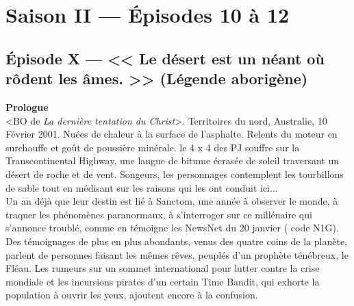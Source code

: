 \documentclass[11pt,twoside,a4paper]{book}
\begin{document}
\clearpage

\chapter*{Saison II --- {\'E}pisodes 10 {\`a} 12}

\section*{{\'E}pisode X --- << \textbf{Le d{\'e}sert est un n{\'e}ant o{\`u} r{\^o}dent les {\^a}mes. } >> (L{\'e}gende aborig{\`e}ne)}


\textbf{\large Prologue}~\\

<BO de \emph{La derni{\`e}re tentation du Christ}>. Territoires du nord, Australie, 10 F{\'e}vrier 2001. Nu{\'e}es de chaleur {\`a} la surface de l'asphalte. Relents du moteur en surchauffe et go{\^u}t de poussi{\`e}re min{\'e}rale. le 4 x 4 des PJ souffre sur la Transcontinental Highway, une langue de bitume {\'e}cras{\'e}e de soleil traversant un d{\'e}sert de roche et de vent. Songeurs, les personnages contemplent les tourbillons de sable tout en m{\'e}disant sur les raisons qui les ont conduit ici...~\\

Un an d{\'e}j{\`a} que leur destin est li{\'e} {\`a} Sanctom, une ann{\'e}e {\`a} observer le monde, {\`a} traquer les ph{\'e}nom{\`e}nes paranormaux, {\`a} s'interroger sur ce mill{\'e}naire qui s'annonce troubl{\'e}, comme en t{\'e}moigne les NewsNet du 20 janvier ( code N1G). Des t{\'e}moignages de plus en plus abondants, venus des quatre coins de la plan{\`e}te, parlent de personnes faisant les m{\^e}mes r{\^e}ves, peupl{\'e}s d'un proph{\`e}te t{\'e}n{\'e}breux, le Fl{\'e}au. Les rumeurs sur un sommet international pour lutter contre la crise mondiale et les incursions pirates d'un certain Time Bandit, qui exhorte la population {\`a} ouvrir les yeux, ajoutent encore {\`a} la confusion.~\\
\end{document}
